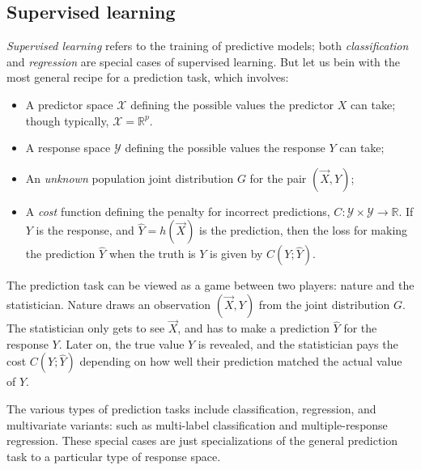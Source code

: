 \subsection{Supervised learning}

\emph{Supervised learning} refers to the training of predictive
models; both \emph{classification} and \emph{regression} are special
cases of supervised learning.  But let us bein with the most general
recipe for a prediction task, which involves:

\begin{itemize}
\item A predictor space $\mathcal{X}$ defining the possible values the
  predictor $X$ can take; though typically, $\mathcal{X} =
  \mathbb{R}^p$.
\item A response space $\mathcal{Y}$ defining the possible values the response $Y$ can take;
\item An \emph{unknown} population joint distribution $G$ for the pair $(\vec{X}, Y)$;
\item A \emph{cost} function defining the penalty for incorrect
  predictions, $C: \mathcal{Y} \times \mathcal{Y} \to \mathbb{R}$.  If
  $Y$ is the response, and $\hat{Y} = h(\vec{X})$ is the prediction, then
  the loss for making the prediction $\hat{Y}$ when the truth is $Y$
  is given by $C(Y; \hat{Y})$.
\end{itemize}

The prediction task can be viewed as a game between two players:
nature and the statistician.  Nature draws an observation $(\vec{X},
Y)$ from the joint distribution $G$.  The statistician only gets to
see $\vec{X}$, and has to make a prediction $\hat{Y}$ for the response
$Y$.  Later on, the true value $Y$ is revealed, and the statistician
pays the cost $C(Y; \hat{Y})$ depending on how well their prediction
matched the actual value of $Y$.

The various types of prediction tasks include classification,
regression, and multivariate variants: such as multi-label
classification and multiple-response regression.  These special cases
are just specializations of the general prediction task to a
particular type of response space.

